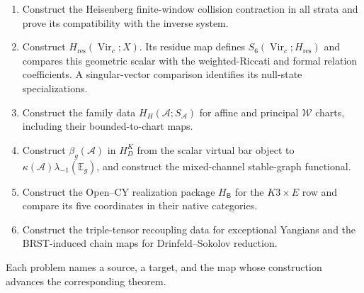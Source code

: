 \documentclass[11pt]{article}
\theoremstyle{plain}
\theoremstyle{definition}
\theoremstyle{remark}
\newcommand{\cA}{\mathcal{A}}
\newcommand{\cW}{\mathcal{W}}
\begin{document}
\begin{enumerate}[label=\textup{(O\arabic*)}]
\item Construct the Heisenberg finite-window collision contraction in
all strata and prove its compatibility with the inverse system.

\item Construct \(H_{\mathrm{res}}(\operatorname{Vir}_c;X)\).  Its
residue map defines \(S_6(\operatorname{Vir}_c;H_{\mathrm{res}})\) and
compares this geometric scalar with the weighted-Riccati and formal
relation coefficients.  A singular-vector comparison identifies its
null-state specializations.

\item Construct the family data \(H_H(\cA;S_\cA)\) for affine and
principal \(\cW\) charts, including their bounded-to-chart maps.

\item Construct \(\beta_g(\cA)\) in \(H_D^K\) from the scalar virtual
bar object to \(\kappa(\cA)\lambda_{-1}(\mathbb E_g)\), and construct
the mixed-channel stable-graph functional.

\item Construct the Open--CY realization package
\(H_{\mathsf B}\) for the \(K3\times E\) row and compare its five
coordinates in their native categories.

\item Construct the triple-tensor recoupling data for exceptional
Yangians and the BRST-induced chain maps for Drinfeld--Sokolov
reduction.
\end{enumerate}

Each problem names a source, a target, and the map whose construction
advances the corresponding theorem.
\end{document}
